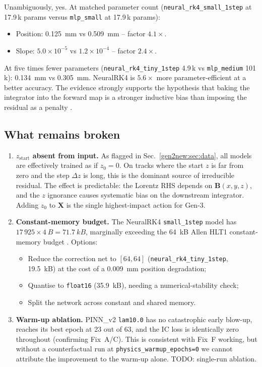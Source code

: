 \documentclass[a4paper,11pt]{article}
\newcommand{\SI}[2]{#1~#2}
\newcommand{\dz}{\Delta z}
\begin{document}
Unambiguously, yes. At matched parameter count
(\texttt{neural\_rk4\_small\_1step} at 17.9\,k params versus
\texttt{mlp\_small} at 17.9\,k params):
\begin{itemize}
\item Position: \SI{0.125}{mm} vs \SI{0.509}{mm} -- factor $4.1\times$.
\item Slope:    $5.0\!\times\!10^{-5}$ vs $1.2\!\times\!10^{-4}$ -- factor $2.4\times$.
\end{itemize}
At five times fewer parameters (\texttt{neural\_rk4\_tiny\_1step}
4.9\,k vs \texttt{mlp\_medium} 101\,k): \SI{0.134}{mm} vs
\SI{0.305}{mm}. NeuralRK4 is $5.6\times$ more parameter-efficient at
a better accuracy. The evidence strongly supports the hypothesis
that baking the integrator into the forward map is a stronger
inductive bias than imposing the residual as a penalty
\cite{ChenNeuralODE2018}.

\subsection{What remains broken}

\begin{enumerate}
\item \textbf{$z_{\mathrm{start}}$ absent from input.} As flagged in
  Sec.~\ref{gen2new:sec:data}, all models are effectively trained as
  if $z_0=0$. On tracks where the start $z$ is far from zero and the
  step $\dz$ is long, this is the dominant source of irreducible
  residual. The effect is predictable: the Lorentz RHS depends on
  $\mathbf{B}(x,y,z)$, and the $z$ ignorance causes systematic bias
  on the downstream integrator. Adding $z_0$ to $\mathbf{X}$ is the
  single highest-impact action for Gen-3.

\item \textbf{Constant-memory budget.} The NeuralRK4
  \texttt{small\_1step} model has $17\,925\times\SI{4}{B}=\SI{71.7}{kB}$,
  marginally exceeding the \SI{64}{kB} Allen HLT1 constant-memory
  budget \cite{Allen,gen1report}. Options:
  \begin{itemize}
  \item Reduce the correction net to $[64,64]$
    (\texttt{neural\_rk4\_tiny\_1step}, \SI{19.5}{kB}) at the cost of
    a \SI{0.009}{mm} position degradation;
  \item Quantise to \texttt{float16} (\SI{35.9}{kB}), needing a
    numerical-stability check;
  \item Split the network across constant and shared memory.
  \end{itemize}

\item \textbf{Warm-up ablation.} PINN\_v2 \texttt{lam10.0} has no
  catastrophic early blow-up, reaches its best epoch at 23 out of
  63, and the IC loss is identically zero throughout (confirming
  Fix~A/C). This is consistent with Fix~F
  \cite{Krishnapriyan2021} working, but without a counterfactual
  run at \texttt{physics\_warmup\_epochs=0} we cannot attribute the
  improvement to the warm-up alone. TODO: single-run ablation.
\end{enumerate}
\end{document}
